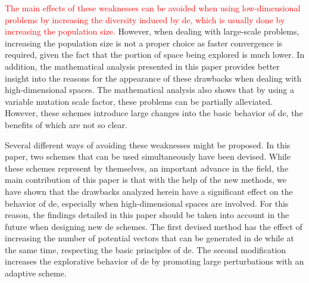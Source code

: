 \documentclass[preprint,3p]{elsarticle}
\newcommand{\DE}{{\sc de}}
\begin{document}
\textcolor{red}{
The main effects of these weaknesses can be avoided when using low-dimensional problems by 
increasing the diversity induced by \DE{}, which is usually done by increasing the
population size.
}
%
However, when dealing with large-scale problems, increasing the population size is not a proper choice
as faster convergence is required, given the fact that the portion of space being explored is much lower.
%
In addition, the mathematical analysis presented in this paper provides better insight into the reasons
for the appearance of these drawbacks when dealing with high-dimensional spaces.
%
The mathematical analysis also shows that by using a variable mutation
scale factor, these problems can be partially alleviated.
%
However, these schemes introduce large changes into the basic behavior of \DE{},
the benefits of which are not so clear.

Several different ways of avoiding these weaknesses might be proposed.
%
In this paper, two schemes that can be used simultaneously have been devised.
%
While these schemes represent by themselves, an important advance in the field,
the main contribution of this paper is that with the help of the new methods, we have
shown that the drawbacks analyzed herein have a significant effect on the behavior of \DE{}, especially when
high-dimensional spaces are involved.
%
For this reason, the findings detailed in this paper should be taken into account in the future when designing new \DE{} schemes.
%
The first devised method has the effect of increasing the number of potential vectors that can be
generated in \DE{} while at the same time, respecting the basic principles of \DE{}.
%
The second modification increases the explorative behavior of \DE{} by promoting large perturbations
with an adaptive scheme.
%
%
\end{document}
